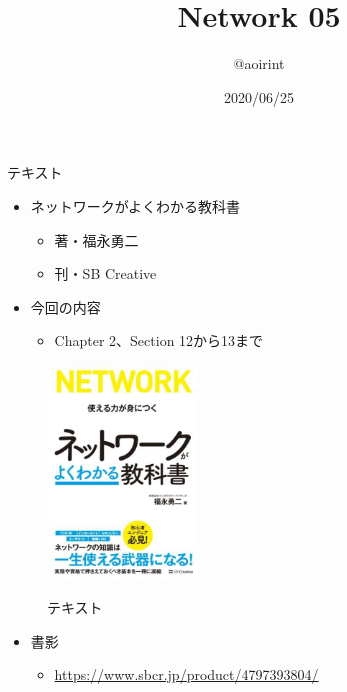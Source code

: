 \documentclass[12pt,aspectratio=169]{beamer}
\title{Network 05}
\author{@aoirint}
\date{2020/06/25}
\begin{document}
\frame{\maketitle}

\begin{frame}{テキスト}

  \begin{minipage}{0.58\textwidth}
    \begin{itemize}
      \item ネットワークがよくわかる教科書
      \begin{itemize}
        \item 著・福永勇二
        \item 刊・SB Creative
      \end{itemize}
      \item 今回の内容
        \begin{itemize}
          \item Chapter 2、Section 12から13まで
        \end{itemize}

    \end{itemize}

  \end{minipage}
  \hfill
  \begin{minipage}{0.38\textwidth}
    \vspace{-1\baselineskip}
    \begin{figure}[h]
      \centering
      \includegraphics[width=4cm,bb=0 0 420 596]{../02/figures/networkbook.jpg}
      \label{fig:networkbook}
      \caption{テキスト}
    \end{figure}
  \end{minipage}

  \begin{itemize}
    \item 書影
    \begin{itemize}
      \item { \small \url{https://www.sbcr.jp/product/4797393804/} }
    \end{itemize}
  \end{itemize}

\end{frame}
\end{document}
